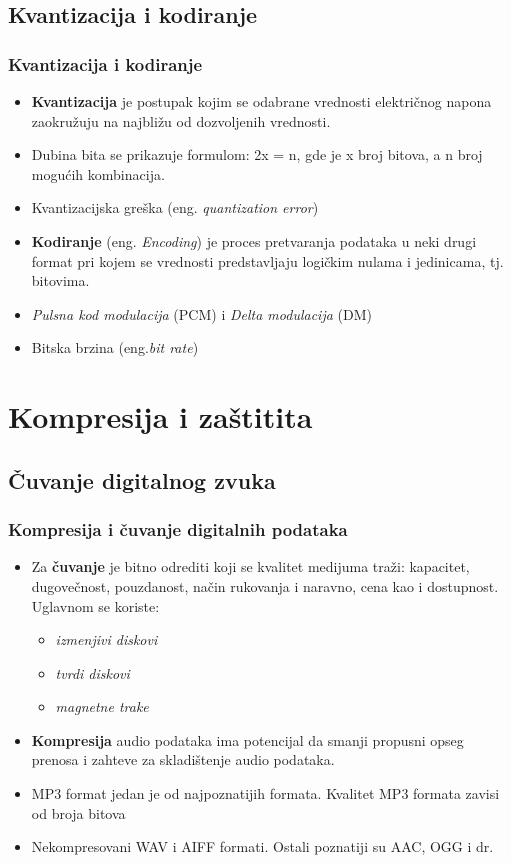 \documentclass{beamer}
\begin{document}
\subsection{Kvantizacija i kodiranje}
\begin{frame}[fragile]\frametitle{Kvantizacija i kodiranje}
	\begin{itemize}	
		\item \textbf{Kvantizacija} je postupak kojim se odabrane vrednosti električnog napona zaokružuju na najbližu od dozvoljenih vrednosti.
		\item Dubina bita se prikazuje formulom: 2x = n, gde je x broj bitova, a n broj mogućih kombinacija.
		\item Kvantizacijska greška (eng. \textit{quantization error})
		\item \textbf{Kodiranje} (eng. \textit{Encoding}) je proces pretvaranja podataka u neki drugi format pri kojem se vrednosti predstavljaju logičkim nulama i jedinicama, tj. bitovima. 
		\item \textit{Pulsna kod modulacija} (PCM) i \textit{Delta modulacija} (DM)
		\item Bitska brzina (eng.\textit{bit rate})
	\end{itemize}
\end{frame}

\section{Kompresija i zaštitita}
\subsection{Čuvanje digitalnog zvuka}
\begin{frame}[fragile]\frametitle{Kompresija i čuvanje digitalnih podataka}
\begin{itemize}
  \item Za \textbf{čuvanje} je bitno odrediti koji se kvalitet medijuma traži: kapacitet, dugovečnost, pouzdanost, način rukovanja i naravno, cena kao i dostupnost. Uglavnom se koriste:
    \begin{itemize}
	 \item \textit{izmenjivi diskovi}
	 \item \textit{tvrdi diskovi}
	 \item \textit{magnetne trake}
    \end{itemize}
  \item \textbf{Kompresija} audio podataka ima potencijal da smanji propusni opseg prenosa i zahteve za skladištenje audio podataka.
  \item MP3 format jedan je od najpoznatijih formata. Kvalitet MP3 formata zavisi od broja bitova
  \item Nekompresovani WAV i AIFF formati. Ostali poznatiji su AAC, OGG i dr.
\end{itemize}
\end{frame}
\end{document}

